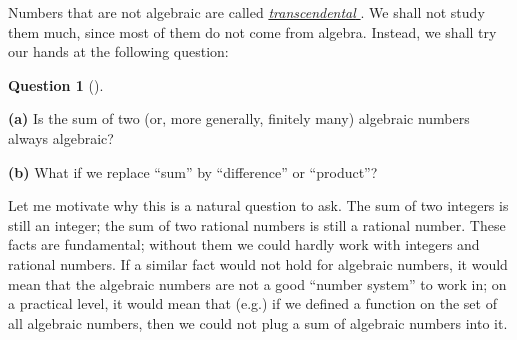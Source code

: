 \documentclass[numbers=enddot,12pt,final,onecolumn,notitlepage]{scrartcl}%
\numberwithin{exer}{subsection}
\theoremstyle{definition}
\newtheorem{quest}[theo]{Question}
\newenvironment{question}[1][]
{\begin{quest}[#1]\begin{leftbar}}
{\end{leftbar}\end{quest}}
\newenvironment{question}[1][Question]{\noindent\textbf{#1.} }{\ \rule{0.5em}{0.5em}}
\begin{document}
Numbers that are not algebraic are called
\href{https://en.wikipedia.org/wiki/Transcendental_number}{\textit{transcendental}%
}. We shall not study them much, since most of them do not come from algebra.
Instead, we shall try our hands at the following question:

\begin{question}
\label{quest.intro.algnum.1} \textbf{(a)} Is the sum of two (or, more
generally, finitely many) algebraic numbers always algebraic?

\textbf{(b)} What if we replace ``sum'' by ``difference'' or ``product''?
\end{question}

Let me motivate why this is a natural question to ask. The sum of two integers
is still an integer; the sum of two rational numbers is still a rational
number. These facts are fundamental; without them we could hardly work with
integers and rational numbers. If a similar fact would not hold for algebraic
numbers, it would mean that the algebraic numbers are not a good ``number
system'' to work in; on a practical level, it would mean that (e.g.) if we
defined a function on the set of all algebraic numbers, then we could not plug
a sum of algebraic numbers into it.
\end{document}
